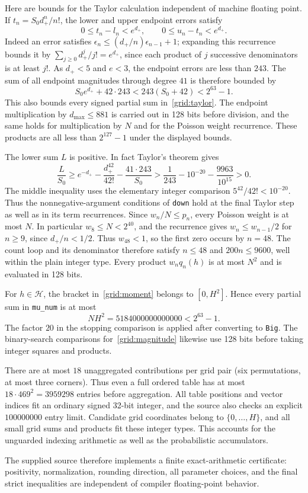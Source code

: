 Here are bounds for the Taylor calculation independent of machine
floating point.  If $t_n=S_0d_+^n/n!$, the lower and upper endpoint
errors satisfy
\[
 0\leq t_n-l_n< e^{d_+},\qquad
 0\leq u_n-t_n< e^{d_+}.
\]
Indeed an error satisfies $\epsilon_n\leq(d_+/n)\epsilon_{n-1}+1$;
expanding this recurrence bounds it by
$\sum_{j\geq0}d_+^j/j!=e^{d_+}$, since each product of $j$ successive
denominators is at least $j!$.  As $d_+<5$ and $e<3$, the endpoint
errors are less than $243$.  The sum of all endpoint magnitudes through
degree $41$ is therefore bounded by
\[
 S_0e^{d_+}+42\cdot243<243(S_0+42)<2^{63}-1.
\]
This also bounds every signed partial sum in~\eqref{grid:taylor}.
The endpoint multiplication by $d_{\max}\leq881$ is carried out in
128 bits before division, and the same holds for multiplication by
$N$ and for the Poisson weight recurrence.  These products are all
less than $2^{127}-1$ under the displayed bounds.

The lower sum $L$ is positive.  In fact Taylor's theorem gives
\[
 \frac{L}{S_0}
 \geq e^{-d_+}-\frac{d_+^{42}}{42!}
                   -\frac{41\cdot243}{S_0}
 >\frac1{243}-10^{-20}-\frac{9963}{10^{15}}>0.
\]
The middle inequality uses the elementary integer comparison
$5^{42}/42!<10^{-20}$.  Thus the nonnegative-argument conditions of
\texttt{down} hold at the final Taylor step as well as in its term
recurrences. Since $w_n/N\leq p_n$, every Poisson weight is at most
$N$. In particular $w_8\leq N<2^{40}$, and the recurrence gives
$w_n\leq w_{n-1}/2$ for $n\geq9$, since $d_+/n<1/2$.
Thus $w_{48}<1$, so the first zero occurs by $n=48$. The count loop
and its denominator therefore satisfy $n\leq48$ and $200n\leq9600$,
well within the plain integer type. Every product $w_nq_n(h)$ is at
most $N^2$ and is evaluated in 128 bits.

For $h\in\mathcal H$, the bracket in~\eqref{grid:moment} belongs to
$[0,H^2]$.  Hence every partial sum in \texttt{mu\_num} is at most
\[
 NH^2=5184000000000000<2^{63}-1.
\]
The factor $20$ in the stopping comparison is applied after converting
to \texttt{Big}.  The binary-search comparisons for~\eqref{grid:magnitude}
likewise use 128 bits before taking integer squares and products.

There are at most $18$ unaggregated contributions per grid pair
(six permutations, at most three corners).  Thus even a full ordered
table has at most $18\cdot469^2=3959298$ entries before aggregation.
All table positions and vector indices fit an ordinary signed 32-bit
integer, and the source also checks an explicit
$100000000$ entry limit.  Candidate grid coordinates belong to
$\{0,\ldots,H\}$, and all small grid sums and products fit these
integer types.  This accounts for the unguarded indexing arithmetic
as well as the probabilistic accumulators.

The supplied source therefore implements a finite exact-arithmetic
certificate: positivity, normalization, rounding direction, all
parameter choices, and the final strict inequalities are independent
of compiler floating-point behavior.
